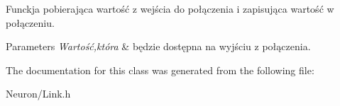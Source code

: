 \-Funckja pobierająca wartość z wejścia do połączenia i zapisująca wartość w połączeniu. 
\begin{DoxyParams}{\-Parameters}
{\em \-Wartość,która} & będzie dostępna na wyjściu z połączenia. \\
\hline
\end{DoxyParams}


\-The documentation for this class was generated from the following file\-:\begin{DoxyCompactItemize}
\item 
\-Neuron/\-Link.\-h\end{DoxyCompactItemize}

